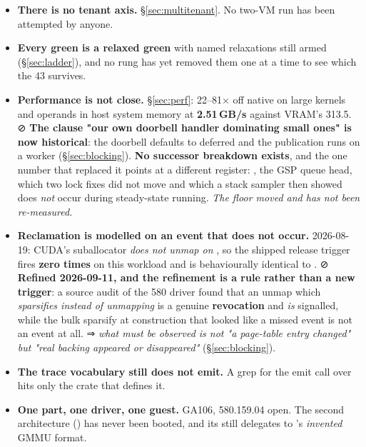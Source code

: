 \documentclass[10.5pt]{article}
\begin{document}
\begin{itemize}
  cause unknown --- and the C artifact's own \emph{"exactly one CUDA process works per QEMU
  lifetime"} was \textbf{not} the same defect after all.
\item \textbf{There is no tenant axis.} \S\ref{sec:multitenant}. No two-VM run has been attempted
  by anyone.
\item \textbf{Every green is a relaxed green} with named relaxations still armed
  (\S\ref{sec:ladder}), and no rung has yet removed them one at a time to see which the 43
  survives.
\item \textbf{Performance is not close.} \S\ref{sec:perf}: 22--81$\times$ off native on large
  kernels and operands in host system memory at \textbf{2.51\,GB/s} against VRAM's 313.5.
  ⊘ \textbf{The clause "our own doorbell handler dominating small ones" is now historical}: the
  doorbell defaults to deferred and the publication runs on a worker (\S\ref{sec:blocking}).
  \textbf{No successor breakdown exists}, and the one number that replaced it points at a
  different register: , the GSP queue head, which two
  lock fixes did not move and which a stack sampler then showed does \emph{not} occur during
  steady-state running. \emph{The floor moved and has not been re-measured.}
\item \textbf{Reclamation is modelled on an event that does not occur.} \measured{} 2026-08-19:
  CUDA's suballocator \emph{does not unmap on }, so the shipped release trigger
  fires \textbf{zero times} on this workload and is behaviourally identical to .
  ⊘ \textbf{Refined 2026-09-11, and the refinement is a rule rather than a new trigger}: a source
  audit of the 580 driver found that an unmap which \emph{sparsifies instead of unmapping} is a
  genuine \textbf{revocation} and \emph{is} signalled, while the bulk sparsify at construction that
  looked like a missed event is not an event at all. ⇒ \emph{what must be observed is not "a
  page-table entry changed" but "real backing appeared or disappeared"} (\S\ref{sec:blocking}).
\item \textbf{The trace vocabulary still does not emit.} A grep for the emit call over
   hits only the crate that defines it.
\item \textbf{One part, one driver, one guest.} GA106, 580.159.04 open. The second architecture
  () has never been booted, and its  still delegates to
  's \emph{invented} GMMU format.
\end{itemize}
\end{document}
